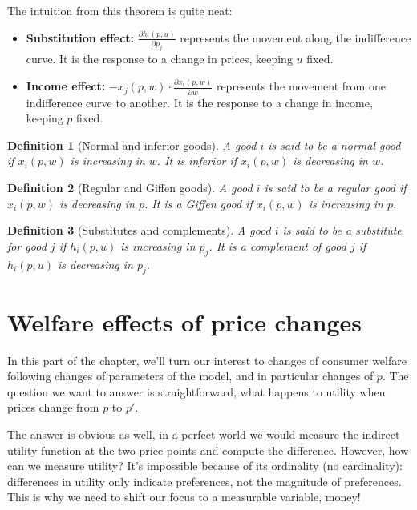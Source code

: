 \documentclass[12pt]{report}
\newtheorem{definition}{Definition}[chapter]
\begin{document}
The intuition from this theorem is quite neat:\begin{itemize}
\item \textbf{Substitution effect:} $\frac{\partial h_i(p,u)}{\partial p_j}$ represents the movement along the indifference curve. It is the response to a change in prices, keeping $u$ fixed.
\item \textbf{Income effect:} $- x_j(p,w)\cdot\frac{\partial x_i(p,w)}{\partial w}$ represents the movement from one indifference curve to another. It is the response to a change in income, keeping $p$ fixed.
\end{itemize}

\begin{definition}[Normal and inferior goods]
A good $i$ is said to be a normal good if $x_i(p,w)$ is increasing in $w$. It is inferior if $x_i(p,w)$ is decreasing in $w$.
\end{definition}

\begin{definition}[Regular and Giffen goods]
A good $i$ is said to be a regular good if $x_i(p,w)$ is decreasing in $p$. It is a Giffen good if $x_i(p,w)$ is increasing in $p$.
\end{definition}

\begin{definition}[Substitutes and complements]
A good $i$ is said to be a substitute for good $j$ if $h_i(p,u)$ is increasing in $p_j$. It is a complement of good $j$ if $h_i(p,u)$ is decreasing in $p_j$.
\end{definition}

\section{Welfare effects of price changes}

In this part of the chapter, we'll turn our interest to changes of consumer welfare following changes of parameters of the model, and in particular changes of $p$. The question we want to answer is straightforward, what happens to utility when prices change from $p$ to $p'$.

The answer is obvious as well, in a perfect world we would measure the indirect utility function at the two price points and compute the difference. However, how can we measure utility? It's impossible because of its ordinality (no cardinality): differences in utility only indicate preferences, not the magnitude of preferences. This is why we need to shift our focus to a measurable variable, money!
\end{document}
